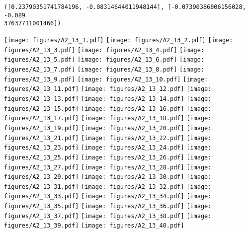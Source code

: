 \documentclass[12pt,a4paper]{article}
\begin{document}
\begin{lstlisting}
([0.23790351741784196, -0.08314644011948144], [-0.07390386806156028, -0.089
37637711001466])
\end{lstlisting}

\texttt{[image: figures/A2\_13\_1.pdf]}
\texttt{[image: figures/A2\_13\_2.pdf]}
\texttt{[image: figures/A2\_13\_3.pdf]}
\texttt{[image: figures/A2\_13\_4.pdf]}
\texttt{[image: figures/A2\_13\_5.pdf]}
\texttt{[image: figures/A2\_13\_6.pdf]}
\texttt{[image: figures/A2\_13\_7.pdf]}
\texttt{[image: figures/A2\_13\_8.pdf]}
\texttt{[image: figures/A2\_13\_9.pdf]}
\texttt{[image: figures/A2\_13\_10.pdf]}
\texttt{[image: figures/A2\_13\_11.pdf]}
\texttt{[image: figures/A2\_13\_12.pdf]}
\texttt{[image: figures/A2\_13\_13.pdf]}
\texttt{[image: figures/A2\_13\_14.pdf]}
\texttt{[image: figures/A2\_13\_15.pdf]}
\texttt{[image: figures/A2\_13\_16.pdf]}
\texttt{[image: figures/A2\_13\_17.pdf]}
\texttt{[image: figures/A2\_13\_18.pdf]}
\texttt{[image: figures/A2\_13\_19.pdf]}
\texttt{[image: figures/A2\_13\_20.pdf]}
\texttt{[image: figures/A2\_13\_21.pdf]}
\texttt{[image: figures/A2\_13\_22.pdf]}
\texttt{[image: figures/A2\_13\_23.pdf]}
\texttt{[image: figures/A2\_13\_24.pdf]}
\texttt{[image: figures/A2\_13\_25.pdf]}
\texttt{[image: figures/A2\_13\_26.pdf]}
\texttt{[image: figures/A2\_13\_27.pdf]}
\texttt{[image: figures/A2\_13\_28.pdf]}
\texttt{[image: figures/A2\_13\_29.pdf]}
\texttt{[image: figures/A2\_13\_30.pdf]}
\texttt{[image: figures/A2\_13\_31.pdf]}
\texttt{[image: figures/A2\_13\_32.pdf]}
\texttt{[image: figures/A2\_13\_33.pdf]}
\texttt{[image: figures/A2\_13\_34.pdf]}
\texttt{[image: figures/A2\_13\_35.pdf]}
\texttt{[image: figures/A2\_13\_36.pdf]}
\texttt{[image: figures/A2\_13\_37.pdf]}
\texttt{[image: figures/A2\_13\_38.pdf]}
\texttt{[image: figures/A2\_13\_39.pdf]}
\texttt{[image: figures/A2\_13\_40.pdf]}
\end{document}
